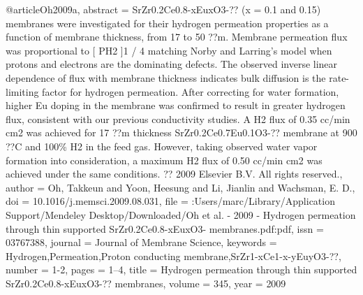 @article{Oh2009a,
abstract = {SrZr0.2Ce0.8-xEuxO3-?? (x = 0.1 and 0.15) membranes were investigated for their hydrogen permeation properties as a function of membrane thickness, from 17 to 50 ??m. Membrane permeation flux was proportional to [ PH2 ]1 / 4 matching Norby and Larring's model when protons and electrons are the dominating defects. The observed inverse linear dependence of flux with membrane thickness indicates bulk diffusion is the rate-limiting factor for hydrogen permeation. After correcting for water formation, higher Eu doping in the membrane was confirmed to result in greater hydrogen flux, consistent with our previous conductivity studies. A H2 flux of 0.35 cc/min cm2 was achieved for 17 ??m thickness SrZr0.2Ce0.7Eu0.1O3-?? membrane at 900 ??C and 100{\%} H2 in the feed gas. However, taking observed water vapor formation into consideration, a maximum H2 flux of 0.50 cc/min cm2 was achieved under the same conditions. ?? 2009 Elsevier B.V. All rights reserved.},
author = {Oh, Takkeun and Yoon, Heesung and Li, Jianlin and Wachsman, E. D.},
doi = {10.1016/j.memsci.2009.08.031},
file = {:Users/marc/Library/Application Support/Mendeley Desktop/Downloaded/Oh et al. - 2009 - Hydrogen permeation through thin supported SrZr0.2Ce0.8-xEuxO3- membranes.pdf:pdf},
issn = {03767388},
journal = {Journal of Membrane Science},
keywords = {Hydrogen,Permeation,Proton conducting membrane,SrZr1-xCe1-x-yEuyO3-??},
number = {1-2},
pages = {1--4},
title = {{Hydrogen permeation through thin supported SrZr0.2Ce0.8-xEuxO3-?? membranes}},
volume = {345},
year = {2009}
}
